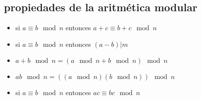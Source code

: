 \subsection{propiedades de la aritmética modular}
\begin{itemize}
\item si $a\equiv b \mod{n}$ entonces $a+c\equiv b+c \mod{n}$
\item si $a\equiv b \mod{n}$ entonces $(a-b) | m$
\item $a+b \mod{n} = (a\mod{n}+b\mod{n}) \mod{n}$
\item $ab \mod{n} = ((a\mod{n}) (b\mod{n})) \mod{n}$
\item si $a\equiv b \mod{n}$ entonces $ac\equiv bc \mod{n}$
\end{itemize}
